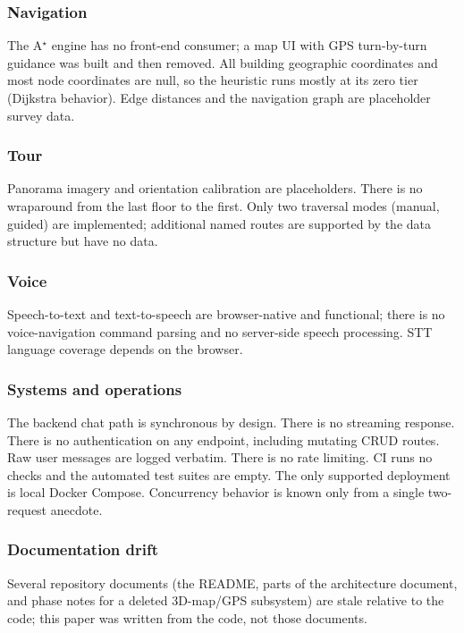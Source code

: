 \subsubsection*{Navigation}
The A$^{\star}$ engine has no front-end consumer; a map UI with GPS
turn-by-turn guidance was built and then removed. All building geographic
coordinates and most node coordinates are null, so the heuristic runs
mostly at its zero tier (Dijkstra behavior). Edge distances and the
navigation graph are placeholder survey data.

\subsubsection*{Tour}
Panorama imagery and orientation calibration are placeholders. There is no
wraparound from the last floor to the first. Only two traversal modes
(manual, guided) are implemented; additional named routes are supported by
the data structure but have no data.

\subsubsection*{Voice}
Speech-to-text and text-to-speech are browser-native and functional; there
is no voice-navigation command parsing and no server-side speech
processing. STT language coverage depends on the browser.

\subsubsection*{Systems and operations}
The backend chat path is synchronous by design. There is no streaming
response. There is no authentication on any endpoint, including mutating
CRUD routes. Raw user messages are logged verbatim. There is no rate
limiting. CI runs no checks and the automated test suites are empty. The
only supported deployment is local Docker Compose. Concurrency behavior is
known only from a single two-request anecdote.

\subsubsection*{Documentation drift}
Several repository documents (the README, parts of the architecture
document, and phase notes for a deleted 3D-map/GPS subsystem) are stale
relative to the code; this paper was written from the code, not those
documents.
